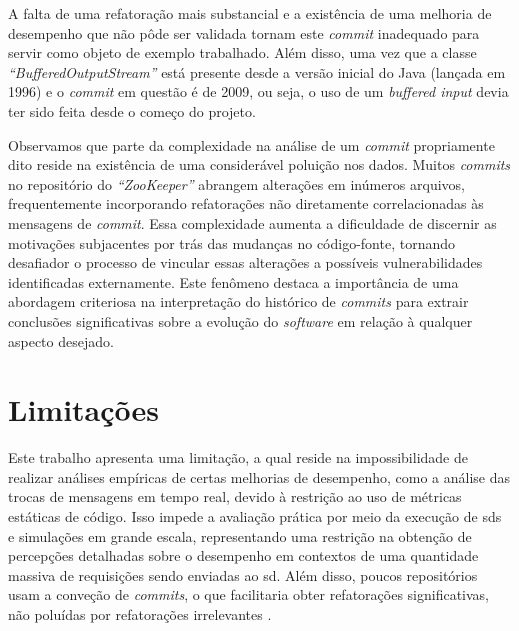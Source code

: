 A falta de uma refatoração mais substancial e a existência de uma melhoria de desempenho que não pôde ser validada tornam este \textit{commit} inadequado para servir como objeto de exemplo trabalhado. Além disso, uma vez que a classe \textit{``BufferedOutputStream''} está presente desde a versão inicial do Java (lançada em 1996) e o \textit{commit} em questão é de 2009, ou seja, o uso de um \textit{buffered input} devia ter sido feita desde o começo do projeto.


Observamos que parte da complexidade na análise de um \textit{commit} propriamente dito reside na existência de uma considerável poluição nos dados. Muitos \textit{commits} no repositório do \textit{``ZooKeeper''} abrangem alterações em inúmeros arquivos, frequentemente incorporando refatorações não diretamente correlacionadas às mensagens de \textit{commit}. Essa complexidade aumenta a dificuldade de discernir as motivações subjacentes por trás das mudanças no código-fonte, tornando desafiador o processo de vincular essas alterações a possíveis vulnerabilidades identificadas externamente. Este fenômeno destaca a importância de uma abordagem criteriosa na interpretação do histórico de \textit{commits} para extrair conclusões significativas sobre a evolução do \textit{software} em relação à qualquer aspecto desejado.

\section{Limitações}
\label{sec:limitacoes}

Este trabalho apresenta uma limitação, a qual reside na impossibilidade de realizar análises empíricas de certas melhorias de desempenho, como a análise das trocas de mensagens em tempo real, devido à restrição ao uso de métricas estáticas de código. Isso impede a avaliação prática por meio da execução de \gls{sds} e simulações em grande escala, representando uma restrição na obtenção de percepções detalhadas sobre o desempenho em contextos de uma quantidade massiva de requisições sendo enviadas ao \gls{sd}. Além disso, poucos repositórios usam a conveção de \textit{commits}, o que facilitaria obter refatorações significativas, não poluídas por refatorações irrelevantes \cite{conventionalcommits}.